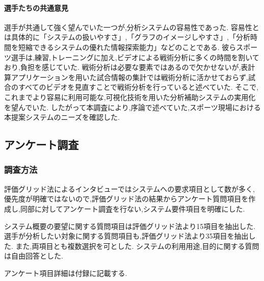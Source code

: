 \documentclass[sotsuron]{kuee}
\begin{document}
				\paragraph{選手たちの共通意見}
					選手が共通して強く望んでいた一つが,分析システムの容易性であった. 
					容易性とは具体的に「システムの扱いやすさ」,「グラフのイメージしやすさ」,「分析時間を短縮できるシステムの優れた情報探索能力」などのことである. 
					彼らスポーツ選手は,練習,トレーニングに加え,ビデオによる戦術分析に多くの時間を割いており,負担を感じていた. 
					戦術分析は必要な要素ではあるので欠かせないが,表計算アプリケーションを用いた試合情報の集計では戦術分析に活かせておらず,試合のすべてのビデオを見直すことで戦術分析を行っていると述べていた. 
					そこで,これまでより容易に利用可能な,可視化技術を用いた分析補助システムの実用化を望んでいた. 
					したがって本調査により,序論で述べていた,スポーツ現場における本提案システムのニーズを確認した. 
		\subsection{アンケート調査}
			\subsubsection{調査方法}
				評価グリッド法によるインタビューではシステムへの要求項目として数が多く,優先度が明確ではないので,評価グリッド法の結果からアンケート質問項目を作成し,同部に対してアンケート調査を行ない,システム要件項目を明確にした. 
				
				システム概要の要望に関する質問項目は評価グリッド法より15項目を抽出した. 
				選手が分析したい対象に関する質問項目も,評価グリッド法より35項目を抽出した. 
				また,両項目とも複数選択を可とした. 
				システムの利用用途,目的に関する質問は自由回答とした. 
				
				アンケート項目詳細は付録に記載する. 
\end{document}
